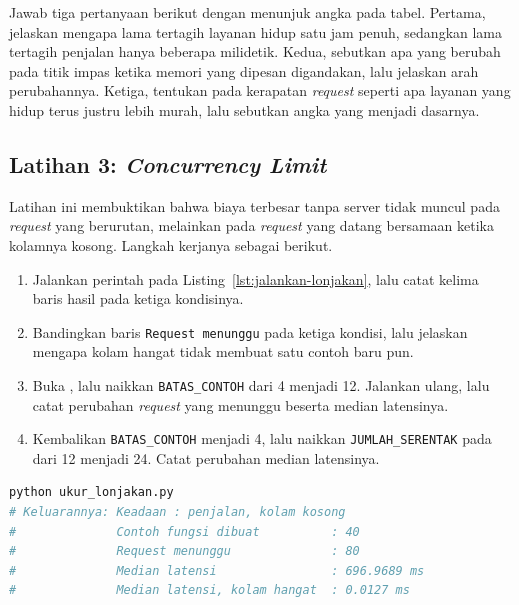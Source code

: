 Jawab tiga pertanyaan berikut dengan menunjuk angka pada tabel. Pertama,
jelaskan mengapa lama tertagih layanan hidup satu jam penuh, sedangkan lama
tertagih penjalan hanya beberapa milidetik. Kedua, sebutkan apa yang berubah
pada titik impas ketika memori yang dipesan digandakan, lalu jelaskan arah
perubahannya. Ketiga, tentukan pada kerapatan \textit{request} seperti apa layanan
yang hidup terus justru lebih murah, lalu sebutkan angka yang menjadi dasarnya.

\subsection*{Latihan 3: \textit{Concurrency Limit}}

Latihan ini membuktikan bahwa biaya terbesar tanpa server tidak muncul pada
\textit{request} yang berurutan, melainkan pada \textit{request} yang datang bersamaan
ketika kolamnya kosong. Langkah kerjanya sebagai berikut.

\begin{enumerate}
  \item Jalankan perintah pada Listing~\ref{lst:jalankan-lonjakan}, lalu catat
    kelima baris hasil pada ketiga kondisinya.
  \item Bandingkan baris \texttt{Request menunggu} pada ketiga kondisi, lalu
    jelaskan mengapa kolam hangat tidak membuat satu contoh baru pun.
  \item Buka , lalu naikkan
    \texttt{BATAS\_CONTOH} dari 4 menjadi 12. Jalankan ulang, lalu catat
    perubahan \textit{request} yang menunggu beserta median latensinya.
  \item Kembalikan \texttt{BATAS\_CONTOH} menjadi 4, lalu naikkan
    \texttt{JUMLAH\_SERENTAK} pada 
    dari 12 menjadi 24. Catat perubahan median latensinya.
\end{enumerate}

\begin{lstlisting}[language=bash, caption={Mengukur \textit{concurrency limit},
  skrip tersedia di \berkas{sources/chapter14/ukur_lonjakan.py}},
  label=lst:jalankan-lonjakan]
python ukur_lonjakan.py
# Keluarannya: Keadaan : penjalan, kolam kosong
#              Contoh fungsi dibuat          : 40
#              Request menunggu              : 80
#              Median latensi                : 696.9689 ms
#              Median latensi, kolam hangat  : 0.0127 ms
\end{lstlisting}

